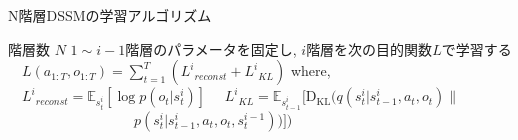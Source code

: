 \documentclass[10pt, twocolumn]{jarticle}
\begin{document}
\begin{algorithm}[h]               
  \caption{\small N階層DSSMの学習アルゴリズム}
  \label{alg1}
  \begin{algorithmic}
    \REQUIRE \small 階層数 $N$ 
        \STATE \small $1 \sim i-1$階層のパラメータを固定し, 
        \STATE \small $i$階層を次の目的関数$L$で学習する
        \STATE $\hspace{1em} L(a_{1:T}, o_{1:T}) = \sum_{t=1}^T ( {L^i}_{reconst} + {L^i}_{KL}) $
        \STATE where, 
        \STATE $\hspace{1em} {L^i}_{reconst} = \mathbb{E}_{s^i_t} [\log p(o_t|s^i_t)]$
        \STATE $\hspace{1em} {L^i}_{KL} = \mathbb{E}_{s^i_{t-1}} [\mathrm{D_{KL}}(q(s^i_t|s^i_{t-1}, a_t, o_t) \| $
        \STATE $\hspace{9em} p(s^i_t|s^i_{t-1}, a_t, o_t, s^{i-1}_t))] )$
      \ENDWHILE
    \ENDFOR
  \end{algorithmic}
\end{algorithm}



\end{document}
